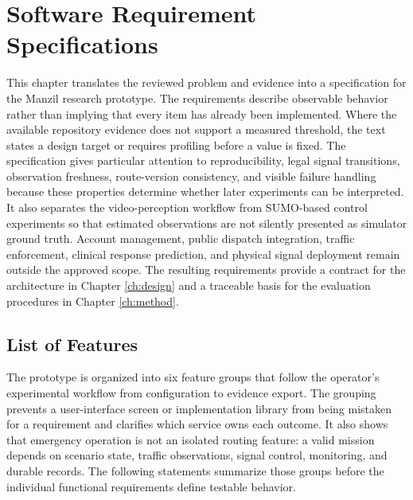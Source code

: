 \chapter{Software Requirement Specifications}
\label{ch:srs}

This chapter translates the reviewed problem and evidence into a specification for the Manzil research prototype. The requirements describe observable behavior rather than implying that every item has already been implemented. Where the available repository evidence does not support a measured threshold, the text states a design target or requires profiling before a value is fixed. The specification gives particular attention to reproducibility, legal signal transitions, observation freshness, route-version consistency, and visible failure handling because these properties determine whether later experiments can be interpreted. It also separates the video-perception workflow from SUMO-based control experiments so that estimated observations are not silently presented as simulator ground truth. Account management, public dispatch integration, traffic enforcement, clinical response prediction, and physical signal deployment remain outside the approved scope. The resulting requirements provide a contract for the architecture in Chapter \ref{ch:design} and a traceable basis for the evaluation procedures in Chapter \ref{ch:method}.

\section{List of Features}

The prototype is organized into six feature groups that follow the operator's experimental workflow from configuration to evidence export. The grouping prevents a user-interface screen or implementation library from being mistaken for a requirement and clarifies which service owns each outcome. It also shows that emergency operation is not an isolated routing feature: a valid mission depends on scenario state, traffic observations, signal control, monitoring, and durable records. The following statements summarize those groups before the individual functional requirements define testable behavior.

